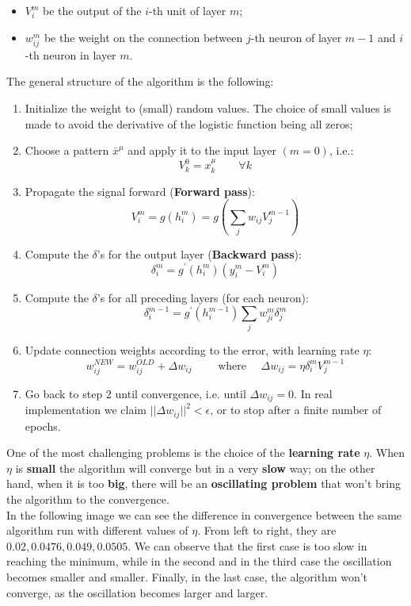 \begin{itemize}
    \item $V_i^m$ be the output of the $i$-th unit of layer $m$;
    \item $w_{ij}^m$ be the weight on the connection between $j$-th neuron of layer $m-1$ and $i$-th neuron in layer $m$. 
\end{itemize}
  
The general structure of the algorithm is the following:

\begin{enumerate}
	\item Initialize the weight to (small) random values. The choice of small values is made to avoid the derivative of the logistic function being all zeros;
	\item Choose a pattern $\bar{x}^\mu$ and apply it to the input layer $(m=0)$, i.e.:
	$$V _ { k } ^ { 0 } = x _ { k } ^ { \mu } \qquad \forall k$$
	\item Propagate the signal forward (\textbf{Forward pass}):
	$$V _ {i} ^ { m } = g \left( h _ { i } ^ { m } \right) = g \left( \sum _ { j } w _ { i j } V _ { j } ^ { m - 1 } \right)$$
	\item Compute the $\delta$'s for the output layer (\textbf{Backward pass}):
	$$\delta _ { i } ^ { m } = g ^ { \prime } \left( h _ { i } ^ { m } \right) \left( y _ { i } ^ { m } - V _ { i } ^ { m } \right)$$
	\item Compute the $\delta$'s for all preceding layers (for each neuron):
	$$\delta _ { i } ^ { m - 1 } = g ^ { \prime } \left( h _ { i } ^ { m - 1 } \right) \sum _ { j } w _ { j i } ^ { m } \delta _ { j } ^ { m }$$
	\item Update connection weights according to the error, with learning rate $\eta$:
	$$w _ { i j } ^ { N E W } = w _ { i j } ^ { O L D } + \Delta w _ { i j } \qquad \text { where } \quad \Delta w _ { i j } = \eta \delta _ { i } ^ { m } V _ { j } ^ { m - 1 }$$
	\item Go back to step 2 until convergence, i.e. until $\Delta w _ { i j } = 0$. In real implementation we claim $||\Delta w _ { i j }||^2 < \epsilon$, or to stop after a finite number of epochs.
\end{enumerate}

One of the most challenging problems is the choice of the \textbf{learning rate} $\eta$. When $\eta$ is \textbf{small} the algorithm will converge but in a very \textbf{slow} way; on the other hand, when it is too \textbf{big}, there will be an \textbf{oscillating problem} that won't bring the algorithm to the convergence. \\
In the following image we can see the difference in convergence between the same algorithm run with different values of $\eta$. From left to right, they are $0.02, 0.0476, 0.049, 0.0505$.
We can observe that the first case is too slow in reaching the minimum, while in the second and in the third case the oscillation becomes smaller and smaller. Finally, in the last case, the algorithm won't converge, as the oscillation becomes larger and larger.\\

